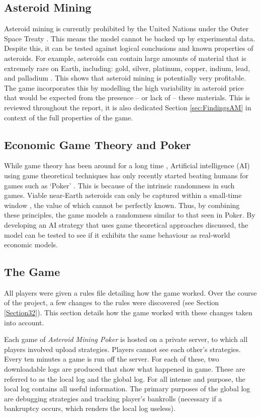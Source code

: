 \documentclass[11pt, twoside]{article}
\begin{document}
\subsection*{Asteroid Mining}
Asteroid mining is currently prohibited by the United Nations under the Outer Space Treaty \cite{OuterSpaceTreaty}. This means the model cannot be backed up by experimental data. Despite this, it can be tested against logical conclusions and known properties of asteroids. For example, asteroids can contain large amounts of material that is extremely rare on Earth, including: gold, silver, platinum, copper, indium, lead, and palladium \cite{sonter1997technical}. This shows that asteroid mining is potentially very profitable. The game incorporates this by modelling the high variability in asteroid price that would be expected from the presence -- or lack of -- these materials. This is reviewed throughout the report, it is also dedicated Section \ref{sec:FindingsAM} in context of the full properties of the game.

\subsection*{Economic Game Theory and Poker}
While game theory has been around for a long time \cite{screpanti2005outline}, Artificial intelligence (AI) using game theoretical techniques has only recently started beating humans for games such as ‘Poker’ \cite{monroe2018ai}. This is because of the intrinsic randomness in such games. Viable near-Earth asteroids can only be captured within a small-time window \cite{sonter1997technical}, the value of which cannot be perfectly known. Thus, by combining these principles, the game models a randomness similar to that seen in Poker. By developing an AI strategy that uses game theoretical approaches discussed, the model can be tested to see if it exhibits the same behaviour as real-world economic models.

\subsection{The Game}
All players were given a rules file detailing how the game worked. Over the course of the project, a few changes to the rules were discovered (see Section \ref{Section32}). This section details how the game worked with these changes taken into account.

Each game of \textit{Asteroid Mining Poker} is hosted on a private server, to which all players involved upload strategies. Players cannot see each other's strategies. Every ten minutes a game is run off the server. For each of these, two downloadable logs are produced that show what happened in game. These are referred to as the local log and the global log. For all intense and purpose, the local log contains all useful information. The primary purposes of the global log are debugging strategies and tracking player's bankrolls (necessary if a bankruptcy occurs, which renders the local log useless).
\end{document}
